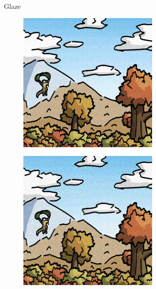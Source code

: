 \documentclass{article}
\begin{document}
\begin{figure}[h]
\begin{subfigure}[t]{\textwidth}
\begin{subfigure}[b]{0.24\textwidth}
     \end{subfigure}
    \caption{Glaze}
    \vspace{0.5em}
    \end{subfigure}
    \begin{subfigure}[t]{\textwidth}
        \begin{subfigure}[b]{0.24\textwidth}
         \centering
         \includegraphics[width=\textwidth]{plots/process/mist/0009.jpeg}
     \end{subfigure}
     \hfill
     \begin{subfigure}[b]{0.24\textwidth}
         \centering
         \includegraphics[width=\textwidth]{plots/process/preprocess/mist/gaussian.jpg}

\end{subfigure}
\end{subfigure}
\end{figure}
\end{document}
